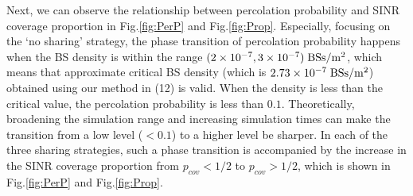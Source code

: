 \documentclass[final]{IEEEtran}
\begin{document}
\indent Next, we can observe the relationship between percolation probability and SINR coverage proportion in Fig.\ref{fig:PerP} and Fig.\ref{fig:Prop}. Especially, focusing on the `no sharing' strategy, the phase transition of percolation probability happens when the BS density is within the range $(2\times 10^{-7},3\times 10^{-7})\;{\rm BSs/m^2}$, which means that approximate critical BS density (which is $2.73\times 10^{-7}\;{\rm BSs/m^2}$) obtained using our method in (12) is valid. When the density is less than the critical value, the percolation probability is less than $0.1$. Theoretically, broadening the simulation range and increasing simulation times can make the transition from a low level ($<0.1$) to a higher level be sharper. In each of the three sharing strategies, such a phase transition is accompanied by the increase in the SINR coverage proportion from $p_{cov}<1/2$ to $p_{cov}>1/2$, which is shown in Fig.\ref{fig:PerP} and Fig.\ref{fig:Prop}.
\end{document}
